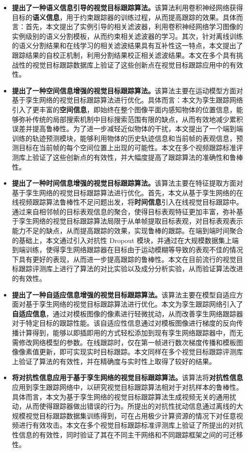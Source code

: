 \begin{itemize}
\item{\textbf{提出了一种语义信息引导的视觉目标跟踪算法。}该算法利用卷积神经网络获得目标的\textbf{语义信息}，用于约束跟踪器的训练过程，从而提高跟踪的效果。具体而言：首先，本文提出了实例引导的相关滤波器，利用卷积神经网络学习图像的实例级别的语义分割模板，从而约束相关滤波器的学习。其次，针对离线训练的语义分割结果和在线学习的相关滤波结果具有互补性这一特点，本文提出了跟踪结果的自校正机制，利用分割结果校正相关滤波结果。本文在多个具有挑战性的视觉目标跟踪数据库上验证了这些创新点在视觉目标跟踪应用中的有效性。}
\item{\textbf{提出了一种空间信息增强的视觉目标跟踪算法。}该算法主要在运动模型方面对基于孪生网络的视觉目标跟踪算法进行优化。具体而言：本文为孪生跟踪网络引入了更丰富的\textbf{空间信息}，即始终在整个图像平面内感知物体的位置信息，能够弥补传统的局部搜索机制中目标搜索范围有限的缺点，从而有效地减少累积误差并提高鲁棒性。为了进一步减轻近似物体的干扰，本文提出了一个端到端训练的轨迹预测模块，能够利用物体的历史轨迹信息和当前帧的表观信息，预测目标在当前帧的每个空间位置上出现的可能性。本文在多个视频跟踪标准评测库上验证了这些创新点的有效性，并大幅度提高了跟踪算法的准确性和鲁棒性。}
\item{\textbf{提出了一种时间信息增强的视觉目标跟踪算法。}该算法主要在特征提取方面对基于孪生网络的视觉目标跟踪算法进行优化。首先，本文从基于孪生网络的在线视频跟踪算法鲁棒性不足问题出发，将\textbf{时间信息}引入在线视觉目标跟踪中。通过来自相邻帧的目标表观信息的聚合，使得目标表观特征更加丰富，弥补基于孪生网络的视觉目标跟踪算法局限于从单帧提取目标表观，对目标表观表示能力不足的缺点，从而提高跟踪的效果，实现鲁棒的跟踪。在端到端时间聚合的基础上，本文通过引入对抗性 Dropout 模块，并通过在大规模数据集上端到端训练，使得孪生网络跟踪器在目标由于运动模糊等导致的表观不佳的情况下具有更好的表现，从而进一步提高跟踪的鲁棒性。本文在目前流行的视觉目标跟踪评测库上进行了算法的对比实验以及成分分析实验，从而验证算法改进的有效性。}
\item{\textbf{提出了一种自适应信息增强的视觉目标跟踪算法。}该算法主要在模型自适应方面对基于孪生网络的视觉目标跟踪算法进行优化。本文为孪生跟踪网络引入了\textbf{自适应信息}，通过对模板图像的像素进行轻微扰动，从而改善孪生网络跟踪器对于特定目标的跟踪性能。该自适应性信息通过对模板图像进行梯度的反向传播计算得到，能够以即插即用的方式轻松添加到现有孪生网络跟踪器中，而无需修改网络模型的参数。在线跟踪时，仅在第一帧进行数次梯度传播和模板图像像素值更新，即可实现实时目标跟踪。本文同样在多个视觉目标跟踪评测库上验证了算法的有效性，并在精确度与实时性上取得了较好的结果。}
\item{\textbf{将对抗性信息应用于基于孪生网络的视觉目标跟踪算法。}该算法将\textbf{对抗性信息}应用到孪生跟踪网络中，以研究视觉目标跟踪算法相对于对抗样本的鲁棒性。具体而言，本文为基于孪生网络的视觉目标跟踪算法生成视频无关的通用扰动，从而使得跟踪器做出错误的行为。所提出的对抗性扰动信息通过离线的大规模视觉目标跟踪数据集训练得到，可在占用极少计算资源的情况下对任意视频进行有效攻击。本文在多个视觉目标跟踪标准评测库上验证了所提出的对抗性信息的有效性，同时验证了其在不同主干网络和不同跟踪框架之间的可迁移性。}
\end{itemize}

